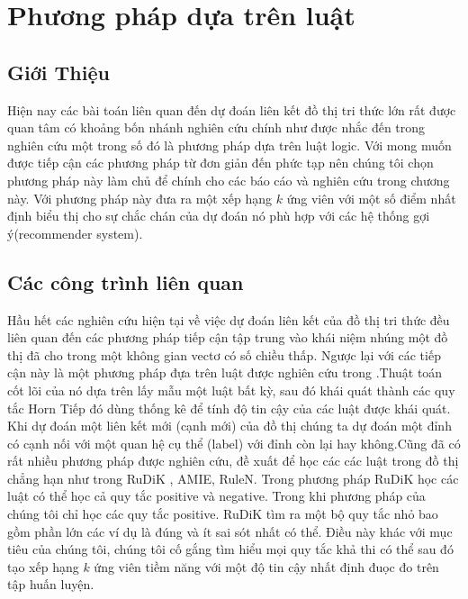 \chapter{Phương pháp dựa trên luật}
\label{Chapter2}

\section{Giới Thiệu}

Hiện nay các bài toán liên quan đến dự đoán liên kết đồ thị tri thức lớn rất được quan tâm có khoảng bốn nhánh nghiên cứu chính như được nhắc đến trong nghiên cứu \cite{ampligraph} một trong số đó là phương pháp dựa trên luật logic. Với mong muốn được tiếp cận các phương pháp từ đơn giản đến phức tạp nên chúng tôi chọn phương pháp này làm chủ để chính cho các báo cáo và nghiên cứu trong chương này. Với phương pháp này đưa ra một xếp hạng \(k\) ứng viên với một số điểm nhất định biểu thị cho sự chắc chán của dự đoán nó phù hợp với các hệ thống gợi ý(recommender system).

\section{Các công trình liên quan}
Hầu hết các nghiên cứu hiện tại về việc dự đoán liên kết của đồ thị tri thức đều liên quan đến các phương pháp tiếp cận tập trung vào khái niệm nhúng một đồ thị đã cho trong một không gian vectơ có số chiều thấp. Ngược lại với các tiếp cận này là một phương pháp đựa trên luật được nghiên cứu trong \cite{burl}.Thuật toán cốt lõi của nó dựa trên lấy mẫu một luật bất kỳ, sau đó khái quát  thành các quy tắc Horn\cite{wiki:Horn} Tiếp đó dùng thống kê để tính độ tin cậy của các luật được khái quát. Khi dự đoán một liên kết mới (cạnh mới) của đồ thị chúng ta dự đoán một đỉnh có cạnh nối với một quan hệ cụ thể (label) với đỉnh còn lại hay không.Cũng đã có rất nhiều phương pháp được nghiên cứu, đề xuất để học các các luật trong đồ thị chẳng hạn như trong   RuDiK \cite{dettmers2018convolutional}, AMIE\cite{galarraga2015fast}, RuleN\cite{meilicke2018fine}. Trong phương pháp RuDiK học các luật có thể học cả quy tắc positive và negative. Trong khi phương pháp của chúng tôi chỉ học các quy tắc positive. RuDiK tìm ra một bộ quy tắc nhỏ bao gồm phần lớn các ví dụ là đúng và ít sai sót nhất có thể. Điều này khác với mục tiêu của chúng tôi, chúng tôi cố gắng tìm hiểu mọi quy tắc khả thi có thể sau đó tạo xếp hạng \(k\) ứng viên tiềm năng với một độ tin cậy nhất định đuọc đo trên tập huấn luyện.

